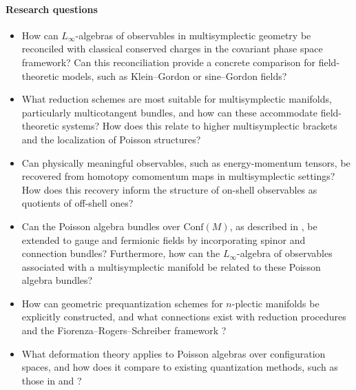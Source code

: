 \documentclass[a4paper]{article}
\begin{document}
\paragraph{Research questions}

\begin{itemize}[noitemsep,topsep=0pt,parsep=0pt,partopsep=0pt]
    \item How can $L_\infty$-algebras of observables in multisymplectic geometry be reconciled with classical conserved charges in the covariant phase space framework? Can this reconciliation provide a concrete comparison for field-theoretic models, such as Klein–Gordon or sine–Gordon fields?
    \item What reduction schemes are most suitable for multisymplectic manifolds, particularly multicotangent bundles, and how can these accommodate field-theoretic systems? How does this relate to higher multisymplectic brackets and the localization of Poisson structures?
        \item Can physically meaningful observables, such as energy-momentum tensors, be recovered from homotopy comomentum maps in multisymplectic settings? How does this recovery inform the structure of on-shell observables as quotients of off-shell ones?
	\item Can the Poisson algebra bundles over $\mathrm{Conf}(M)$, as described in \cite{Frabetti2024}, be extended to gauge and fermionic fields by incorporating spinor and connection bundles? Furthermore, how can the $L_\infty$-algebra of observables associated with a multisymplectic manifold be related to these Poisson algebra bundles?

    \item How can geometric prequantization schemes for $n$-plectic manifolds be explicitly constructed, and what connections exist with reduction procedures and the Fiorenza–Rogers–Schreiber framework \cite{Fiorenza2014a}?
    \item What deformation theory applies to Poisson algebras over configuration spaces, and how does it compare to existing quantization methods, such as those in \cite{Herscovich-2019} and \cite{Dito:1990}?
\end{itemize}
\end{document}
